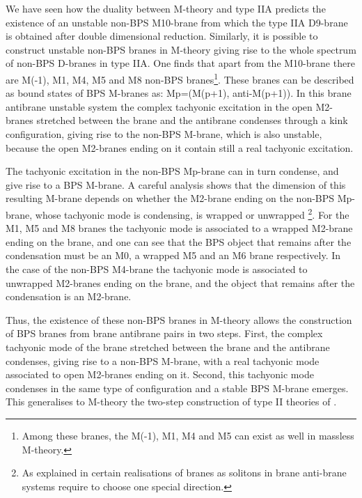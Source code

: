 \documentclass[12pt,a4paper]{article}
\begin{document}
We have seen how the duality between M-theory and type IIA predicts
the existence of an unstable non-BPS M10-brane from which the type IIA
D9-brane is obtained after double dimensional reduction. Similarly, it
is possible to construct unstable non-BPS branes in M-theory giving
rise to the whole spectrum of non-BPS D-branes in type IIA. One finds
that apart from the M10-brane there are M(-1), M1, M4, M5 and M8
non-BPS branes\footnote{Among these branes, the M(-1), M1, M4 and M5 can 
exist as well in massless M-theory.}. 
These branes can be described as bound states of
BPS M-branes as: Mp=(M(p+1), anti-M(p+1)). In this brane antibrane
unstable system the complex tachyonic excitation in the
open M2-branes stretched between the brane and the antibrane
condenses through a kink configuration, giving rise to the non-BPS
M-brane, which is also unstable, because the open M2-branes ending on 
it contain still a real tachyonic excitation.

The tachyonic excitation in the non-BPS Mp-brane can in turn
condense, and give rise to a BPS M-brane. A careful analysis shows
that the dimension of this resulting M-brane  
depends on whether the M2-brane ending on the non-BPS Mp-brane,
whose tachyonic mode is condensing, is wrapped or unwrapped 
\footnote{ As explained in \cite{HL1} certain realisations of branes
as solitons in brane anti-brane systems require to choose one
special direction.}. 
For the M1, M5 and M8 branes
the tachyonic mode is associated to a wrapped M2-brane ending on the
brane, and one can see that the BPS object that remains after the
condensation must be an M0, a wrapped M5 and an M6 brane respectively. 
In the case of the non-BPS M4-brane the tachyonic mode is associated
to unwrapped M2-branes ending on the brane, and the object that remains after
the condensation is an M2-brane.
 
Thus, the existence of these non-BPS branes in 
M-theory allows the construction of
BPS branes from brane antibrane pairs in two steps. First, the complex
tachyonic mode of the brane stretched between the brane and the antibrane
condenses, giving rise to a non-BPS M-brane, with a real tachyonic mode
associated to open M2-branes ending on it. Second, this tachyonic mode
condenses in the same type of configuration and a stable BPS M-brane 
emerges. This generalises to M-theory the two-step construction of type II 
theories of \cite{Sen1,Sen3}. 
\end{document}
